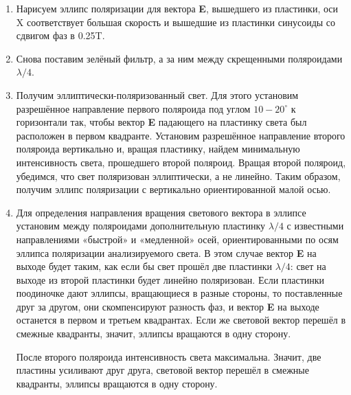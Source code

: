 \begin{enumerate}

    \item Нарисуем эллипс поляризации для вектора \textbf{E}, вышедшего из пластинки, оси X соответствует большая скорость и вышедшие из пластинки синусоиды со сдвигом фаз в 0.25T.
    \begin{figure}[h!]
    \end{figure}

    \item  Снова поставим зелёный фильтр,
а за ним между скрещенными поляроидами
$\lambda/4$.
\item Получим эллиптически-поляризованный свет. Для этого установим разрешённое направление первого поляроида под углом $10-20^{\circ}$ к горизонтали так, чтобы вектор \textbf{E} падающего на пластинку света был расположен в первом квадранте.
Установим разрешённое направление второго поляроида вертикально и, вращая пластинку, найдем минимальную
интенсивность света, прошедшего второй поляроид. Вращая второй поляроид, убедимся, что свет поляризован эллиптически,
а не линейно.
Таким образом, получим эллипс поляризации с вертикально ориентированной малой осью.
\item  Для определения направления вращения светового вектора в эллипсе
установим между поляроидами дополнительную пластинку $\lambda/4$ с известными направлениями «быстрой» и «медленной» осей, ориентированными по осям эллипса поляризации анализируемого света.
В этом случае вектор \textbf{E} на выходе будет таким, как если бы свет прошёл две
пластинки $\lambda/4$: свет на выходе из второй пластинки будет линейно поляризован. Если пластинки поодиночке дают эллипсы, вращающиеся в разные стороны, то поставленные друг за другом, они скомпенсируют
разность фаз, и вектор \textbf{E} на выходе останется в первом
и третьем квадрантах. Если
же световой вектор перешёл в смежные квадранты, значит, эллипсы вращаются в одну сторону. 
\par После второго поляроида интенсивность света максимальна. Значит, две пластины усиливают друг друга, световой вектор перешёл в смежные квадранты, эллипсы вращаются в одну сторону.

\end{enumerate}

